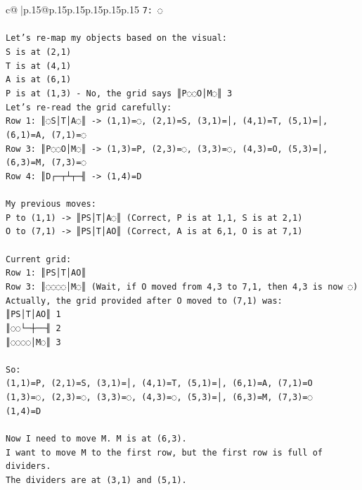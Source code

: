 \documentclass{article}
\begin{document}
{\begin{supertabular}{c@{$\;$}|p{.15\linewidth}@{}p{.15\linewidth}p{.15\linewidth}p{.15\linewidth}p{.15\linewidth}p{.15\linewidth}}
{{{\texttt{7: ◌} \\
\\ 
\texttt{Let's re{-}map my objects based on the visual:} \\
\texttt{S is at (2,1)} \\
\texttt{T is at (4,1)} \\
\texttt{A is at (6,1)} \\
\texttt{P is at (1,3) {-} No, the grid says ║P◌◌O│M◌║ 3} \\
\texttt{Let's re{-}read the grid carefully:} \\
\texttt{Row 1: ║◌S│T│A◌║ {-}> (1,1)=◌, (2,1)=S, (3,1)=│, (4,1)=T, (5,1)=│, (6,1)=A, (7,1)=◌} \\
\texttt{Row 3: ║P◌◌O│M◌║ {-}> (1,3)=P, (2,3)=◌, (3,3)=◌, (4,3)=O, (5,3)=│, (6,3)=M, (7,3)=◌} \\
\texttt{Row 4: ║D┌─┬┴┬─╢ {-}> (1,4)=D} \\
\\ 
\texttt{My previous moves:} \\
\texttt{P to (1,1) {-}> ║PS│T│A◌║ (Correct, P is at 1,1, S is at 2,1)} \\
\texttt{O to (7,1) {-}> ║PS│T│AO║ (Correct, A is at 6,1, O is at 7,1)} \\
\\ 
\texttt{Current grid:} \\
\texttt{Row 1: ║PS│T│AO║} \\
\texttt{Row 3: ║◌◌◌◌│M◌║ (Wait, if O moved from 4,3 to 7,1, then 4,3 is now ◌)} \\
\texttt{Actually, the grid provided after O moved to (7,1) was:} \\
\texttt{║PS│T│AO║ 1} \\
\texttt{║◌◌└─┼──╢ 2} \\
\texttt{║◌◌◌◌│M◌║ 3} \\
\\ 
\texttt{So:} \\
\texttt{(1,1)=P, (2,1)=S, (3,1)=│, (4,1)=T, (5,1)=│, (6,1)=A, (7,1)=O} \\
\texttt{(1,3)=◌, (2,3)=◌, (3,3)=◌, (4,3)=◌, (5,3)=│, (6,3)=M, (7,3)=◌} \\
\texttt{(1,4)=D} \\
\\ 
\texttt{Now I need to move M. M is at (6,3).} \\
\texttt{I want to move M to the first row, but the first row is full of dividers.} \\
\texttt{The dividers are at (3,1) and (5,1).} \\
}}}
\end{supertabular}}
\end{document}
